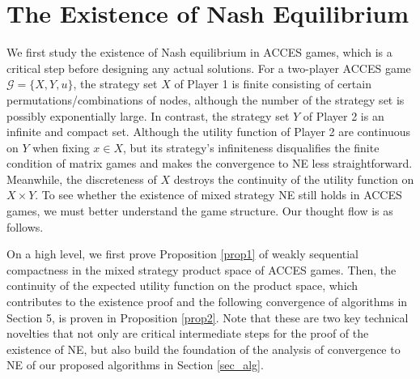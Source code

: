 
\section{The Existence of Nash Equilibrium}

We first study the existence of Nash equilibrium in ACCES games, which is a critical step before designing any actual solutions. For a two-player ACCES game $\mathcal{G}=\{X, Y, u\}$, the strategy set $X$ of Player 1 is finite consisting of certain permutations/combinations of nodes, although the number of the strategy set is possibly exponentially large. In contrast, the strategy set $Y$ of Player 2 is an infinite and compact set. Although the utility function of Player 2 are continuous on $Y$ when fixing $x \in X$, but its strategy's infiniteness disqualifies the finite condition of matrix games and makes the convergence to NE less straightforward. Meanwhile, the discreteness of $X$ destroys the continuity of the utility function on $X \times Y$.
To see whether the existence of mixed strategy NE still holds in ACCES games, we must better understand the game structure. Our thought flow is as follows.

On a high level, we first prove Proposition \ref{prop1} of weakly sequential compactness in the mixed strategy product space of ACCES games. Then, the continuity of the expected utility function on the product space, which contributes to the existence proof and the following convergence of algorithms in Section 5, is proven in Proposition \ref{prop2}. Note that these are two key technical novelties that not only are critical intermediate steps for the proof of the existence of NE, but also build the foundation of the analysis of convergence to NE of our proposed algorithms in Section \ref{sec_alg}.



